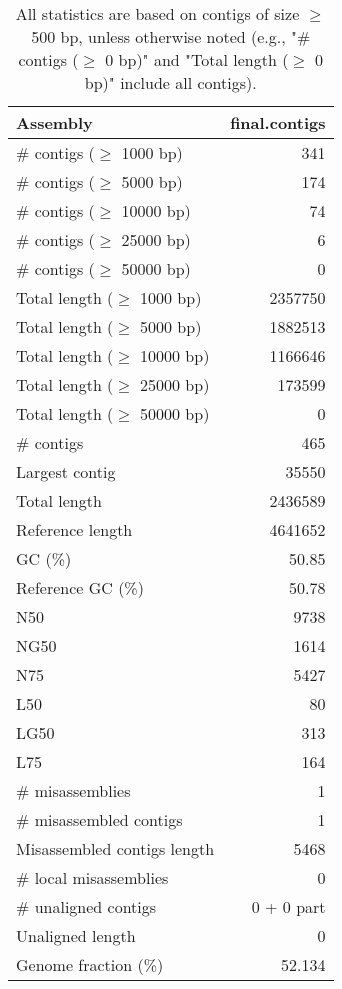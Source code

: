 \documentclass[12pt,a4paper]{article}
\begin{document}
\begin{table}[ht]
\begin{center}
\caption{All statistics are based on contigs of size $\geq$ 500 bp, unless otherwise noted (e.g., "\# contigs ($\geq$ 0 bp)" and "Total length ($\geq$ 0 bp)" include all contigs).}
\begin{tabular}{|l*{1}{|r}|}
\hline
Assembly & final.contigs \\ \hline
\# contigs ($\geq$ 1000 bp) & 341 \\ \hline
\# contigs ($\geq$ 5000 bp) & 174 \\ \hline
\# contigs ($\geq$ 10000 bp) & 74 \\ \hline
\# contigs ($\geq$ 25000 bp) & 6 \\ \hline
\# contigs ($\geq$ 50000 bp) & 0 \\ \hline
Total length ($\geq$ 1000 bp) & 2357750 \\ \hline
Total length ($\geq$ 5000 bp) & 1882513 \\ \hline
Total length ($\geq$ 10000 bp) & 1166646 \\ \hline
Total length ($\geq$ 25000 bp) & 173599 \\ \hline
Total length ($\geq$ 50000 bp) & 0 \\ \hline
\# contigs & 465 \\ \hline
Largest contig & 35550 \\ \hline
Total length & 2436589 \\ \hline
Reference length & 4641652 \\ \hline
GC (\%) & 50.85 \\ \hline
Reference GC (\%) & 50.78 \\ \hline
N50 & 9738 \\ \hline
NG50 & 1614 \\ \hline
N75 & 5427 \\ \hline
L50 & 80 \\ \hline
LG50 & 313 \\ \hline
L75 & 164 \\ \hline
\# misassemblies & 1 \\ \hline
\# misassembled contigs & 1 \\ \hline
Misassembled contigs length & 5468 \\ \hline
\# local misassemblies & 0 \\ \hline
\# unaligned contigs & 0 + 0 part \\ \hline
Unaligned length & 0 \\ \hline
Genome fraction (\%) & 52.134 \\ \hline

\end{tabular}
\end{center}
\end{table}
\end{document}
